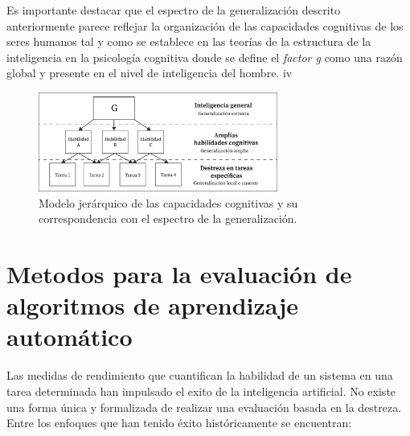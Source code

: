Es importante destacar que el espectro de la generalización descrito anteriormente parece reflejar la organización de las capacidades cognitivas de los seres humanos tal y como se establece en las teorías de la estructura de la inteligencia en la psicología cognitiva donde se define el \textit{factor g} como una razón global y presente en el nivel de inteligencia del hombre. 
iv

\begin{figure}[ht!]
    \centering
    \includegraphics[width=0.7\textwidth]{Graphics/g-factor.png}
    \caption{Modelo jerárquico de las capacidades cognitivas y su correspondencia con el espectro de la generalización.}
    \label{fig:g-factor}
\end{figure}

\section{Metodos para la evaluación de algoritmos de aprendizaje automático}\label{section:state-of-the-art:evaluating-algoritms}

Las medidas de rendimiento que cuantifican la habilidad de un sistema en una tarea determinada han impulsado el exito de la inteligencia artificial. No existe una forma única y formalizada de realizar una evaluación basada en la destreza. Entre los enfoques que han tenido éxito históricamente se encuentran:

